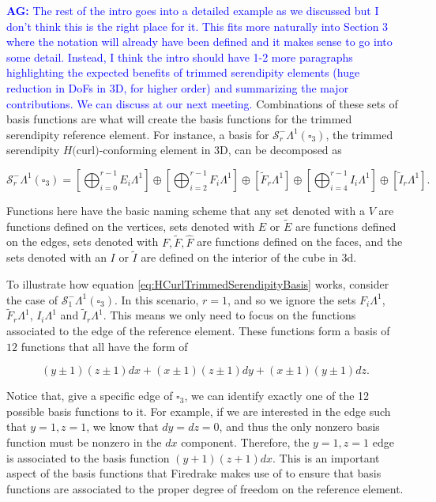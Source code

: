 \documentclass[manuscript,screen]{acmart}
\newcommand{\akg}[1]{{\textcolor{blue}{\textbf{AG:} #1}}}
\newcommand{\calS}{\mathcal{S}}
\begin{document}
   \akg{The rest of the intro goes into a detailed example as we discussed but I don't think this is the right place for it.  This fits more naturally into Section 3 where the notation will already have been defined and it makes sense to go into some detail.  Instead, I think the intro should have 1-2 more paragraphs highlighting the expected benefits of trimmed serendipity elements (huge reduction in DoFs in 3D, for higher order) and summarizing the major contributions.  We can discuss at our next meeting.}
   Combinations of these sets of basis functions are what will create the basis functions for the trimmed serendipity reference element.  For instance, a basis for $\calS^-_r\Lambda^1(\square_3)$, the trimmed serendipity $H($curl$)$-conforming element in 3D, can be decomposed as
   
   \begin{equation}\label{eq:HCurlTrimmedSerendipityBasis}
   \calS^-_r\Lambda^1(\square_3) =    \left[\bigoplus_{i=0}^{r-1} E_i \Lambda^1\right]\oplus\left[ \bigoplus_{i=2}^{r-1}F_i \Lambda^1\right] \oplus \left[\tilde{F}_r \Lambda^1\right]\oplus\left[ \bigoplus_{i=4}^{r-1}I_i \Lambda^1 \right] \oplus \left[\tilde{I}_r \Lambda^1\right].
   \end{equation}
   
  Functions here have the basic naming scheme that any set denoted with a $V$ are functions defined on the vertices, sets denoted with $E$ or $\tilde{E}$ are functions defined on the edges, sets denoted with $F, \tilde{F}, \hat{F}$ are functions defined on the faces, and the sets denoted with an $I$ or $\tilde{I}$ are defined on the interior of the cube in 3d. 
  
  \begin{example}\label{ex:UsingComputationalBasis}
  To illustrate how equation \ref{eq:HCurlTrimmedSerendipityBasis} works, consider the case of $\calS_1^-\Lambda^1(\square_3)$.  In this scenario, $r=1$, and so we ignore the sets $F_i\Lambda^1$, $\tilde{F}_r\Lambda^1$, $I_i \Lambda^1$ and $\tilde{I}_r\Lambda^1$.  This means we only need to focus on the functions associated to the edge of the reference element.  These functions form a basis of $12$ functions that all have the form of
  
  \begin{equation*}
      (y\pm 1)(z\pm 1)dx + (x\pm 1)(z\pm 1) dy + (x \pm 1)(y \pm 1)dz.
  \end{equation*}
  
  Notice that, give a specific edge of $\square_3$, we can identify exactly one of the 12 possible basis functions to it.  For example, if we are interested in the edge such that $y=1, z=1$, we know that $dy = dz = 0$, and thus the only nonzero basis function must be nonzero in the $dx$ component. Therefore, the $y=1, z=1$ edge is associated to the basis function $(y+1)(z+1)dx$.  This is an important aspect of the basis functions that Firedrake makes use of to ensure that basis functions are associated to the proper degree of freedom on the reference element.
  \end{example}
  
\end{document}

